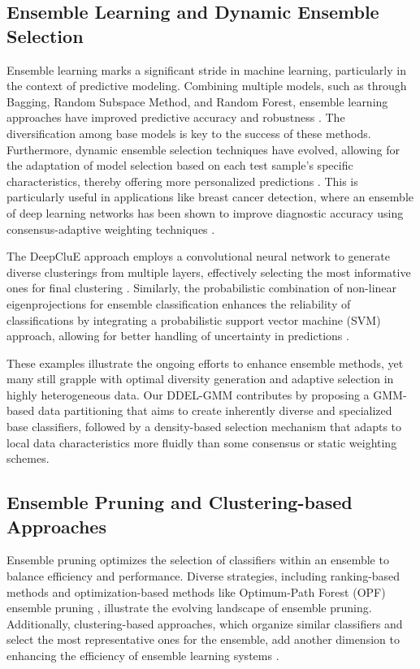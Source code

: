 \documentclass[lettersize,journal]{IEEEtran}
\newcommand{\greenhighlight}[1]{\textcolor{highlightgreen}{#1}}
\begin{document}
\subsection{Ensemble Learning and Dynamic Ensemble Selection}
\noindent Ensemble learning marks a significant stride in machine learning, particularly in the context of predictive modeling. Combining multiple models, such as through Bagging, Random Subspace Method, and Random Forest, ensemble learning approaches have improved predictive accuracy and robustness \cite{cruz_dynamic_2018}. The diversification among base models is key to the success of these methods. Furthermore, dynamic ensemble selection techniques have evolved, allowing for the adaptation of model selection based on each test sample's specific characteristics, thereby offering more personalized predictions \cite{ko_dynamic_2008}. This is particularly useful in applications like breast cancer detection, where an ensemble of deep learning networks has been shown to improve diagnostic accuracy using consensus-adaptive weighting techniques \cite{dehghan_rouzi_breast_2023}. 

The DeepCluE approach employs a convolutional neural network to generate diverse clusterings from multiple layers, effectively selecting the most informative ones for final clustering \cite{huang_deepclue_2023}. Similarly, the probabilistic combination of non-linear eigenprojections for ensemble classification enhances the reliability of classifications by integrating a probabilistic support vector machine (SVM) approach, allowing for better handling of uncertainty in predictions \cite{arco_probabilistic_2023}.

\greenhighlight{These examples illustrate the ongoing efforts to enhance ensemble methods, yet many still grapple with optimal diversity generation and adaptive selection in highly heterogeneous data. Our DDEL-GMM contributes by proposing a GMM-based data partitioning that aims to create inherently diverse and specialized base classifiers, followed by a density-based selection mechanism that adapts to local data characteristics more fluidly than some consensus or static weighting schemes.}

\subsection{Ensemble Pruning and Clustering-based Approaches}
\noindent Ensemble pruning optimizes the selection of classifiers within an ensemble to balance efficiency and performance. Diverse strategies, including ranking-based methods and optimization-based methods like Optimum-Path Forest (OPF) ensemble pruning \cite{fernandes_pruning_2017}, illustrate the evolving landscape of ensemble pruning. Additionally, clustering-based approaches, which organize similar classifiers and select the most representative ones for the ensemble, add another dimension to enhancing the efficiency of ensemble learning systems \cite{cruz_dynamic_2018}.
\end{document}
